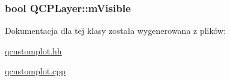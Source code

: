 \subsubsection[{\texorpdfstring{m\+Visible}{mVisible}}]{\setlength{\rightskip}{0pt plus 5cm}bool Q\+C\+P\+Layer\+::m\+Visible\hspace{0.3cm}{\ttfamily [protected]}}\hypertarget{class_q_c_p_layer_a264950deb08e589460c126c895a1e2b5}{}\label{class_q_c_p_layer_a264950deb08e589460c126c895a1e2b5}


Dokumentacja dla tej klasy została wygenerowana z plików\+:\begin{DoxyCompactItemize}
\item 
\hyperlink{qcustomplot_8hh}{qcustomplot.\+hh}\item 
\hyperlink{qcustomplot_8cpp}{qcustomplot.\+cpp}\end{DoxyCompactItemize}
